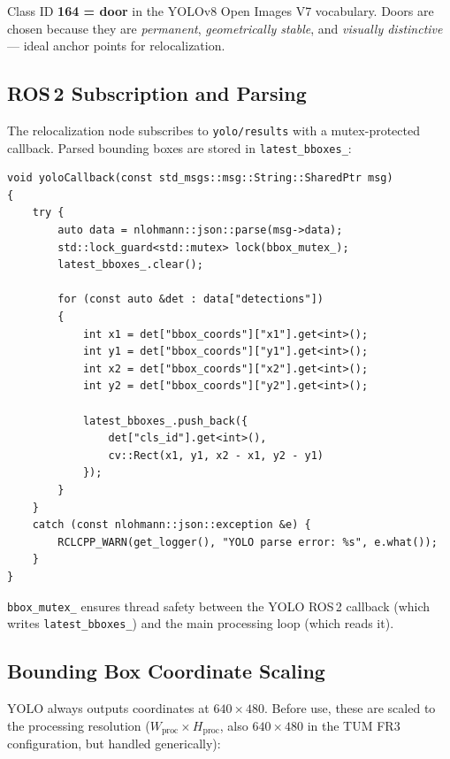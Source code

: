 \documentclass[12pt,a4paper]{article}
\begin{document}
\begin{notebox}
Class ID \textbf{164 = door} in the YOLOv8 Open Images V7 vocabulary. Doors are
chosen because they are \emph{permanent}, \emph{geometrically stable}, and
\emph{visually distinctive} --- ideal anchor points for relocalization.
\end{notebox}

\subsection{ROS\,2 Subscription and Parsing}

The relocalization node subscribes to \texttt{yolo/results} with a mutex-protected
callback. Parsed bounding boxes are stored in \texttt{latest\_bboxes\_}:

\begin{lstlisting}[style=cpp,
  caption={\texttt{yoloCallback()} ---
           \texttt{relocalization\_node.cpp}, lines\,450--467}]
void yoloCallback(const std_msgs::msg::String::SharedPtr msg)
{
    try {
        auto data = nlohmann::json::parse(msg->data);
        std::lock_guard<std::mutex> lock(bbox_mutex_);
        latest_bboxes_.clear();

        for (const auto &det : data["detections"])
        {
            int x1 = det["bbox_coords"]["x1"].get<int>();
            int y1 = det["bbox_coords"]["y1"].get<int>();
            int x2 = det["bbox_coords"]["x2"].get<int>();
            int y2 = det["bbox_coords"]["y2"].get<int>();

            latest_bboxes_.push_back({
                det["cls_id"].get<int>(),
                cv::Rect(x1, y1, x2 - x1, y2 - y1)
            });
        }
    }
    catch (const nlohmann::json::exception &e) {
        RCLCPP_WARN(get_logger(), "YOLO parse error: %s", e.what());
    }
}
\end{lstlisting}

\begin{notebox}
\texttt{bbox\_mutex\_} ensures thread safety between the YOLO ROS\,2 callback (which
writes \texttt{latest\_bboxes\_}) and the main processing loop (which reads it).
\end{notebox}

\subsection{Bounding Box Coordinate Scaling}

YOLO always outputs coordinates at $640\times480$. Before use, these are scaled to the
processing resolution ($W_\text{proc}\times H_\text{proc}$, also $640\times480$ in the
TUM FR3 configuration, but handled generically):
\end{document}
